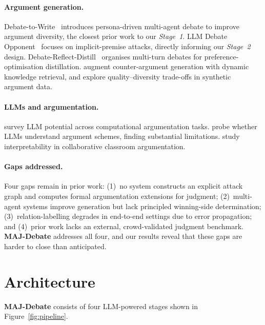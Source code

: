 \documentclass[11pt,twocolumn,letterpaper]{article}
\newcommand{\sys}{\textbf{MAJ-Debate}}
\newcommand{\stage}[1]{\textit{Stage~#1}}
\begin{document}
\paragraph{Argument generation.}
Debate-to-Write~\citep{hu2025debate2write} introduces persona-driven
multi-agent debate to improve argument diversity, the closest prior work
to our \stage{1}.
LLM Debate Opponent~\citep{ozaki2025llmdebate} focuses on
implicit-premise attacks, directly informing our \stage{2} design.
Debate-Reflect-Distill~\citep{zhou2025debatereflect} organises multi-turn
debates for preference-optimisation distillation.
\citet{yeginbergen2025dynamic} augment counter-argument generation with
dynamic knowledge retrieval, and \citet{bao2025quality} explore
quality--diversity trade-offs in synthetic argument data.

\paragraph{LLMs and argumentation.}
\citet{chen2024exploring} survey LLM potential across computational
argumentation tasks.
\citet{bezou2025largellm} probe whether LLMs understand argument schemes,
finding substantial limitations.
\citet{wangchen2024interpretability} study interpretability in collaborative
classroom argumentation.

\paragraph{Gaps addressed.}
Four gaps remain in prior work:
(1)~no system constructs an explicit attack graph and computes formal
argumentation extensions for judgment;
(2)~multi-agent systems improve generation but lack principled
winning-side determination;
(3)~relation-labelling degrades in end-to-end settings due to error
propagation; and
(4)~prior work lacks an external, crowd-validated judgment benchmark.
\sys{} addresses all four, and our results reveal that these gaps are
harder to close than anticipated.

\section{Architecture}

\sys{} consists of four LLM-powered stages shown in
Figure~\ref{fig:pipeline}.
\end{document}
